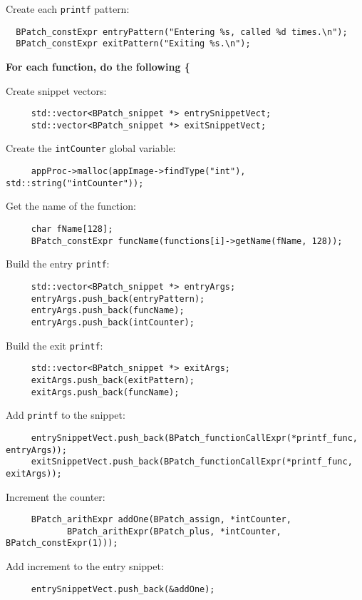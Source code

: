 \documentclass{article}
\begin{document}
\noindent Create each \verb!printf! pattern:
\begin{lstlisting}
  BPatch_constExpr entryPattern("Entering %s, called %d times.\n");
  BPatch_constExpr exitPattern("Exiting %s.\n");
\end{lstlisting}

\noindent \textbf{For each function, do the following \{}

Create snippet vectors:
\begin{lstlisting}
     std::vector<BPatch_snippet *> entrySnippetVect;
     std::vector<BPatch_snippet *> exitSnippetVect;
\end{lstlisting}

Create the \verb!intCounter! global variable:
\begin{lstlisting}
     appProc->malloc(appImage->findType("int"), std::string("intCounter"));
\end{lstlisting}

Get the name of the function:
\begin{lstlisting}
     char fName[128];
     BPatch_constExpr funcName(functions[i]->getName(fName, 128));
\end{lstlisting}

Build the entry \verb!printf!:
\begin{lstlisting}
     std::vector<BPatch_snippet *> entryArgs;
     entryArgs.push_back(entryPattern);
     entryArgs.push_back(funcName);
     entryArgs.push_back(intCounter);
\end{lstlisting}

Build the exit \verb!printf!:
\begin{lstlisting}
     std::vector<BPatch_snippet *> exitArgs;
     exitArgs.push_back(exitPattern);
     exitArgs.push_back(funcName);
\end{lstlisting}

Add \verb!printf! to the snippet:
\begin{lstlisting}
     entrySnippetVect.push_back(BPatch_functionCallExpr(*printf_func, entryArgs));
     exitSnippetVect.push_back(BPatch_functionCallExpr(*printf_func, exitArgs));
\end{lstlisting}

Increment the counter:
\begin{lstlisting}
     BPatch_arithExpr addOne(BPatch_assign, *intCounter, 
            BPatch_arithExpr(BPatch_plus, *intCounter, BPatch_constExpr(1)));
\end{lstlisting}

Add increment to the entry snippet:
\begin{lstlisting}
     entrySnippetVect.push_back(&addOne);
\end{lstlisting}
\end{document}
